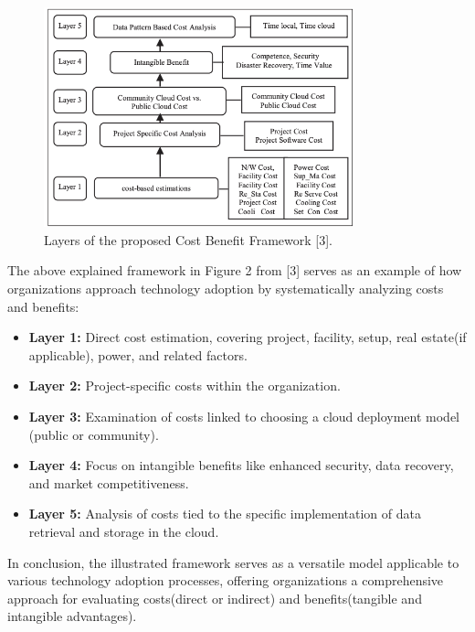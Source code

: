 \documentclass{article}
\begin{document}
\begin{figure}[h]
    \centering
    \includegraphics[width=0.8\textwidth]{Figure2.png}
    \caption{Layers of the proposed Cost Benefit Framework [3].}
    \label{fig:conceptual-model}
\end{figure}

\noindent The above explained framework in Figure 2 from [3] serves as an example of how organizations approach technology adoption by systematically analyzing costs and benefits:
\begin{itemize}
    \item \textbf{Layer 1:} Direct cost estimation, covering project, facility, setup, real estate(if applicable), power, and related factors.
    \item \textbf{Layer 2:} Project-specific costs within the organization.
    \item \textbf{Layer 3:} Examination of costs linked to choosing a cloud deployment model (public or community).
    \item \textbf{Layer 4:} Focus on intangible benefits like enhanced security, data recovery, and market competitiveness.
    \item \textbf{Layer 5:} Analysis of costs tied to the specific implementation of data retrieval and storage in the cloud.
\end{itemize}

\noindent In conclusion, the illustrated framework serves as a versatile model applicable to various technology adoption processes, offering organizations a comprehensive approach for evaluating costs(direct or indirect) and benefits(tangible and intangible advantages).
\end{document}
